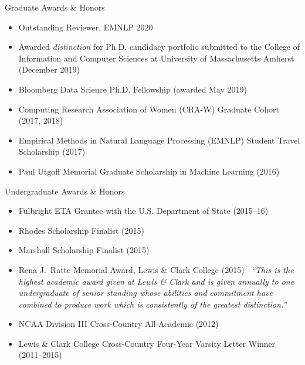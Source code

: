 \documentclass{resume} %
\begin{document}


\begin{rSection}{Graduate Awards \& Honors}
\begin{itemize}
\item Outstanding Reviewer, EMNLP 2020
\item Awarded \emph{distinction} for Ph.D. candidacy portfolio submitted to the College of Information and Computer Sciences at University of Massachusetts Amherst (December 2019) 
\item Bloomberg Data Science Ph.D. Fellowship (awarded May 2019)  
\item Computing Research Association of Women (CRA-W) Graduate Cohort (2017, 2018) 
\item Empirical Methods in Natural Language Processing (EMNLP) Student Travel Scholarship (2017)
\item Paul Utgoff Memorial Graduate Scholarship in Machine Learning (2016) 
\end{itemize} 
\end{rSection}

\begin{rSection}{Undergraduate Awards \& Honors}
\begin{itemize}
\item Fulbright ETA Grantee with the U.S. Department of State (2015--16)
\item Rhodes Scholarship Finalist (2015) 
\item Marshall Scholarship Finalist (2015) 
\item Rena J.~Ratte Memorial Award, Lewis \& Clark College (2015)-- \emph{``This is the highest academic award given at Lewis \& Clark and is given annually to one undergraduate of senior standing whose abilities and commitment have combined to produce work which is consistently of the greatest distinction.''} 
\item NCAA Division III Cross-Country All-Academic (2012) 
\item Lewis \& Clark College Cross-Country Four-Year Varsity Letter Winner (2011--2015)
\end{itemize} 
\end{rSection}
\end{document}
